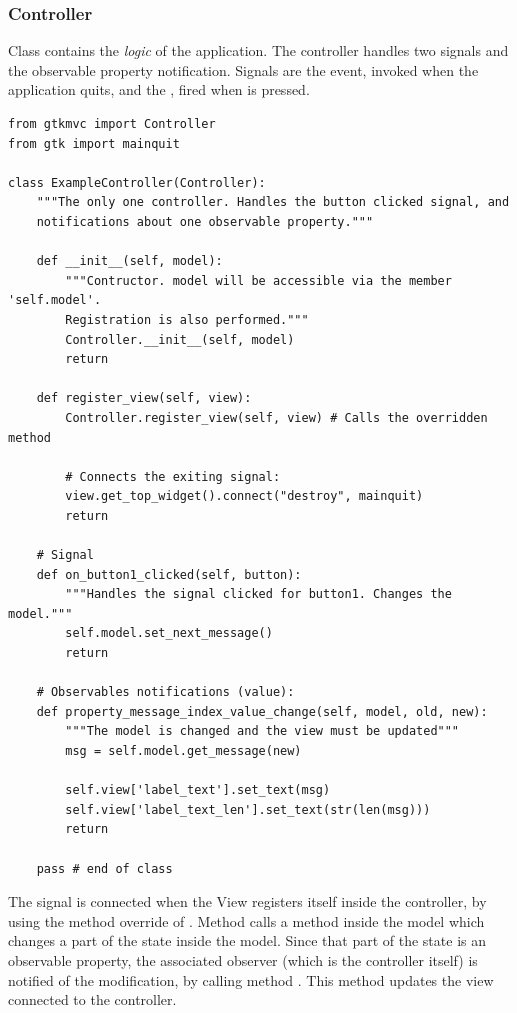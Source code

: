 \subsubsection{Controller}
Class  contains the \emph{logic} of the
application. The controller handles two signals and the observable
property notification. Signals are the  event,
invoked when the application quits, and the
, fired when  is
pressed.

{ \codesize 
\begin{verbatim} 
from gtkmvc import Controller
from gtk import mainquit

class ExampleController(Controller):
    """The only one controller. Handles the button clicked signal, and
    notifications about one observable property."""

    def __init__(self, model):
        """Contructor. model will be accessible via the member 'self.model'.
        Registration is also performed."""
        Controller.__init__(self, model)
        return

    def register_view(self, view):
        Controller.register_view(self, view) # Calls the overridden method

        # Connects the exiting signal:
        view.get_top_widget().connect("destroy", mainquit)
        return

    # Signal
    def on_button1_clicked(self, button):
        """Handles the signal clicked for button1. Changes the model."""
        self.model.set_next_message()
        return

    # Observables notifications (value):
    def property_message_index_value_change(self, model, old, new):
        """The model is changed and the view must be updated"""
        msg = self.model.get_message(new)
        
        self.view['label_text'].set_text(msg)
        self.view['label_text_len'].set_text(str(len(msg)))
        return    

    pass # end of class
\end{verbatim}
}

The  signal is connected when the View registers
itself inside the controller, by using the method override of
.  Method 
calls a method inside the model which changes a part of the state
inside the model. Since that part of the state is an observable
property, the associated observer (which is the controller itself) is
notified of the modification, by calling method
. This method
updates the view connected to the controller.

